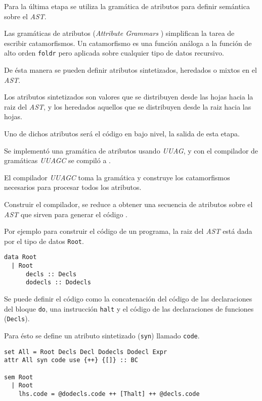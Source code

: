   Para la última etapa se utiliza la gramática de atributos para definir
semántica sobre el \emph{AST}.

Las gramáticas de atributos (\emph{Attribute Grammars}
\cite{attributegrammars} \cite{uuag}) simplifican
la tarea de escribir catamorfismos.
Un catamorfismo es una función análoga a la función de alto orden
\texttt{foldr} pero aplicada sobre cualquier tipo de datos recursivo.

  De ésta manera se pueden definir atributos sintetizados,
  heredados o mixtos en el \emph{AST}.

  Los atributos sintetizados son valores que se distribuyen desde las
hojas hacia la raiz del \emph{AST}, y los heredados aquellos que
se distribuyen desde la raiz hacia las hojas.

  Uno de dichos atributos será el código en bajo nivel, la salida
de esta etapa.

  Se implementó una gramática de atributos usando \textit{UUAG}, y con
  el compilador de gramáticas \textit{UUAGC}\cite{uuagc} se
  compiló a \haskell{}.

  El compilador \textit{UUAGC} toma la gramática y construye los
  catamorfismos necesarios para procesar todos los atributos.

  Construir el compilador, se reduce a obtener una secuencia de atributos
  sobre el \textit{AST} que sirven para generar el código \alf{}.

  Por ejemplo para construir el código de un programa, la raiz
  del \textit{AST} está dada por el tipo de datos \texttt{Root}.

\begin{Verbatim}
data Root
  | Root
      decls :: Decls
      dodecls :: Dodecls
\end{Verbatim}

  Se puede definir el código como la concatenación del código de
  las declaraciones del bloque \texttt{do}, una instrucción \texttt{halt}
  y el código de las declaraciones de funciones (\texttt{Decls}).

  Para ésto se define un atributo sintetizado (\texttt{syn})
  llamado \texttt{code}.


\begin{Verbatim}
set All = Root Decls Decl Dodecls Dodecl Expr
attr All syn code use {++} {[]} :: BC

sem Root
  | Root
    lhs.code = @dodecls.code ++ [Thalt] ++ @decls.code
\end{Verbatim}

